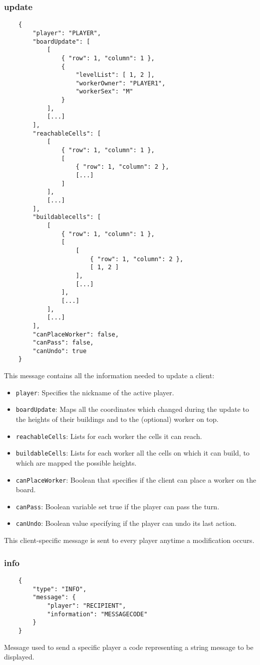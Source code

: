 \documentclass[a4paper,12pt,english]{article}
\begin{document}
	\subsubsection{update}
	\begin{verbatim}
	{
	    "player": "PLAYER",
	    "boardUpdate": [
	        [ 
	            { "row": 1, "column": 1 }, 
	            {
	                "levelList": [ 1, 2 ], 
	                "workerOwner": "PLAYER1",
	                "workerSex": "M"
	            } 
	        ],
	        [...]    
	    ], 
	    "reachableCells": [
	        [ 
	            { "row": 1, "column": 1 }, 
	            [
	                { "row": 1, "column": 2 },
	                [...]
	            ] 
	        ],
	        [...]
	    ],
	    "buildablecells": [
	        [
	            { "row": 1, "column": 1 }, 
	            [ 
	                [ 
	                    { "row": 1, "column": 2 },
	                    [ 1, 2 ]
	                ], 
	                [...] 
	            ],
	            [...]
	        ],
	        [...]
	    ],
	    "canPlaceWorker": false,
	    "canPass": false,
	    "canUndo": true	    
	}
	\end{verbatim}
	This message contains all the information needed to update a client:
	\begin{itemize}
		\item \texttt{player}: Specifies the nickname of the active player.
		\item \texttt{boardUpdate}: Maps all the coordinates which changed during the update to the heights of their buildings and to the (optional) worker on top.
		\item \texttt{reachableCells}: Lists for each worker the cells it can reach.
		\item \texttt{buildableCells}: Lists for each worker all the cells on which it can build, to which are mapped the possible heights.
		\item \texttt{canPlaceWorker}: Boolean that specifies if the client can place a worker on the board.
		\item \texttt{canPass}: Boolean variable set true if the player can pass the turn.
		\item \texttt{canUndo}: Boolean value specifying if the player can undo its last action.
	\end{itemize}
	This client-specific message is sent to every player anytime a modification occurs.

	\subsubsection{info}
	\begin{verbatim}
	{
	    "type": "INFO",
	    "message": {
	        "player": "RECIPIENT",
	        "information": "MESSAGECODE"
	    }
	}
	\end{verbatim}
	Message used to send a specific player a code representing a string message to be displayed.
	
\end{document}
